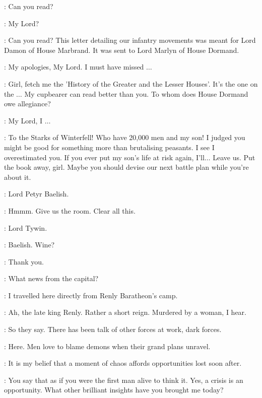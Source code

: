 \TYWIN: Can you read? 

\AMORY: My Lord? 

\TYWIN: Can you read?   This letter detailing our infantry movements was meant for Lord Damon of House Marbrand. It was sent to Lord Marlyn of House Dormand. 

\AMORY: My apologies, My Lord. I must have missed $\ldots$  

\TYWIN: Girl, fetch me the 'History of the Greater and the Lesser Houses'.  It's the one on the $\ldots$    My cupbearer can read better than you. To whom does House Dormand owe allegiance? 

\AMORY: My Lord, I $\ldots$  

\TYWIN: To the Starks of Winterfell! Who have 20,000 men and my son! I judged you might be good for something more than brutalising peasants. I see I overestimated you. If you ever put my son's life at risk again, I'll$\ldots$ Leave us.   Put the book away, girl.   Maybe you should devise our next battle plan while you're about it. 

\HERALD: Lord Petyr Baelish. 

\TYWIN: Hmmm. Give us the room.   Clear all this. 


\LITTLEFINGER: Lord Tywin. 

\TYWIN: Baelish. Wine? 

\LITTLEFINGER: Thank you. 

\TYWIN: What news from the capital? 

\LITTLEFINGER: I travelled here directly from Renly Baratheon's camp. 

\TYWIN: Ah, the late king Renly. Rather a short reign. Murdered by a woman, I hear. 


\LITTLEFINGER: So they say. There has been talk of other forces at work, dark forces. 

\TYWIN: Here. Men love to blame demons when their grand plans unravel. 

\LITTLEFINGER: It is my belief that a moment of chaos affords opportunities lost soon after. 

\TYWIN: You say that as if you were the first man alive to think it. Yes, a crisis is an opportunity. What other brilliant insights have you brought me today? 

